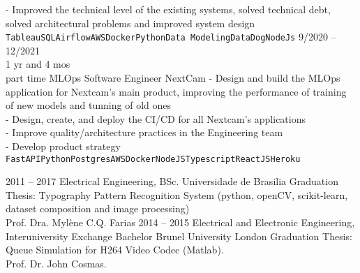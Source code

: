 \documentclass[9pt]{developercv} %
\begin{document}
\begin{entrylist}
{  - Improved the technical level of the existing systems, solved technical debt, solved architectural problems and improved system design
\\\texttt{Tableau}\slashsep\texttt{SQL}\slashsep\texttt{Airflow}\slashsep\texttt{AWS}\slashsep\texttt{Docker}\slashsep\texttt{Python}\slashsep\texttt{Data Modeling}\slashsep\texttt{DataDog}\slashsep\texttt{NodeJs}}
	\entry
		{9/2020 -- 12/2021\\\footnotesize{1 yr and 4 mos\\part time}}
		{MLOps Software Engineer}
		{NextCam}
		{- Design and build the MLOps application for Nextcam's main product, improving the performance of training of new models and tunning of old ones\\
- Design, create, and deploy the CI/CD for all Nextcam's applications\\
- Improve quality/architecture practices in the Engineering team\\
- Develop product strategy
\\\texttt{FastAPI}\slashsep\texttt{Python}\slashsep\texttt{Postgres}\slashsep\texttt{AWS}\slashsep\texttt{Docker}\slashsep\texttt{NodeJS}\slashsep\texttt{Typescript}\slashsep\texttt{ReactJS}\slashsep\texttt{Heroku}}
\end{entrylist}



\begin{entrylist}
	\entry
		{2011 -- 2017}
		{Electrical Engineering, BSc.}
		{Universidade de Brasilia}
		{Graduation Thesis: Typography Pattern Recognition System (python, openCV, scikit-learn, dataset composition and image processing)\\
Prof. Dra. Mylène C.Q. Farias}
	\entry
		{2014 -- 2015}
		{Electrical and Electronic Engineering, Interuniversity Exchange Bachelor}
		{Brunel University London}
		{Graduation Thesis: Queue Simulation for H264 Video Codec (Matlab).\\
Prof. Dr. John Cosmas.}
\end{entrylist}

\end{document}
